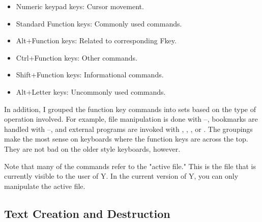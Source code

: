 \begin{itemize}
\item Numeric keypad keys: Cursor movement.
\item Standard Function keys: Commonly used commands.
\item Alt+Function keys: Related to corresponding Fkey.
\item Ctrl+Function keys: Other commands.
\item Shift+Function keys: Informational commands.
\item Alt+Letter keys: Uncommonly used commands.
\end{itemize}

In addition, I grouped the function key commands into sets based on the type of operation
involved. For example, file manipulation is done with --, bookmarks are
handled with --, and external programs are invoked with ,
, , or . The groupings make the most sense on
keyboards where the function keys are across the top. They are not bad on the older style
keyboards, however.

Note that many of the commands refer to the "active file." This is the file that is currently
visible to the user of Y. In the current version of Y, you can only manipulate the active file.

\subsection{Text Creation and Destruction}


